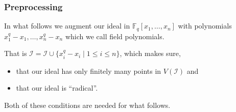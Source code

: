 \documentclass[9pt]{beamer}
\newcommand{\F}[1][]{\ensuremath{\mathbb{F}_{#1}}\xspace}
\newcommand{\I}{\ensuremath{\mathcal{I}}\xspace}
\newcommand{\gens}{\ensuremath{x_1,\dots,x_{n}}\xspace}
\begin{document}
\begin{frame}
\frametitle{Preprocessing}

In what follows we augment our ideal in $\F[q][\gens]$ with polynomials $x_1^q - x_1,\dots,x_n^q - x_n$ which we call field polynomials. 

\vspace{1em}

That is $\I = \I \cup \{x_i^q - x_i \mid 1 \leq i \leq n\}$, which makes sure,
\begin{itemize}
 \item that our ideal has only finitely many points in $V(\I)$ and
 \item that our ideal is ``radical''.
\end{itemize}

Both of these conditions are needed for what follows.
\end{frame}
\end{document}
